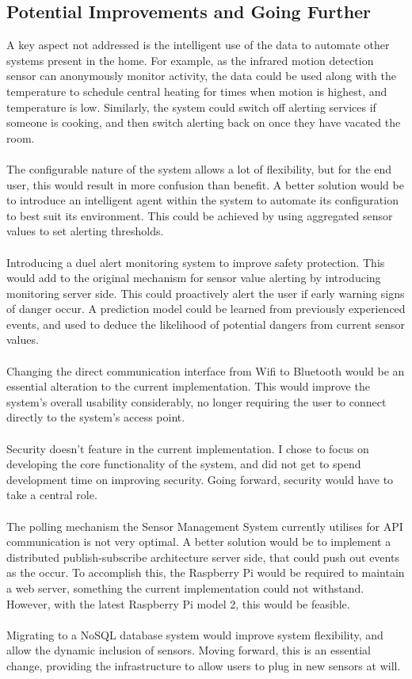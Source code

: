 \documentclass{article}
\begin{document}
\subsection{Potential Improvements and Going Further}
A key aspect not addressed is the intelligent use of the data to automate other systems present in the home. For example, as the infrared motion detection sensor can anonymously monitor activity, the data could be used along with the temperature to schedule central heating for times when motion is highest, and temperature is low. Similarly, the system could switch off alerting services if someone is cooking, and then switch alerting back on once they have vacated the room. \\\\
The configurable nature of the system allows a lot of flexibility, but for the end user, this would result in more confusion than benefit. A better solution would be to introduce an intelligent agent within the system to automate its configuration to best suit its environment. This could be achieved by using aggregated sensor values to set alerting thresholds.\\\\
Introducing a duel alert monitoring system to improve safety protection. This would add to the original mechanism for sensor value alerting by introducing monitoring server side. This could proactively alert the user if early warning signs of danger occur. A prediction model could be learned from previously experienced events, and used to deduce the likelihood of potential dangers from current sensor values. \\\\	
Changing the direct communication interface from Wifi to Bluetooth would be an essential alteration to the current implementation. This would improve the system\rq s overall usability considerably, no longer requiring the user to connect directly to the system\rq s access point. \\\\
Security doesn’t feature in the current implementation. I chose to focus on developing the core functionality of the system, and did not get to spend development time on improving security. Going forward, security would have to take a central role. \\\\
The polling mechanism the Sensor Management System currently utilises for API communication is not very optimal. A better solution would be to implement a distributed publish-subscribe architecture server side, that could push out events as the occur. To accomplish this, the Raspberry Pi would be required to maintain a web server, something the current implementation could not withstand. However, with the latest Raspberry Pi model 2, this would be feasible. \\\\
Migrating to a NoSQL database system would improve system flexibility, and allow the dynamic inclusion of sensors. Moving forward, this is an essential change, providing the infrastructure to allow users to plug in new sensors at will.
\end{document}
